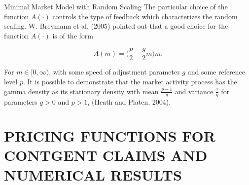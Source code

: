 \documentclass[unknownkeysallowed, compress]{beamer}
\theoremstyle{plain}
\begin{document}
\begin{frame}[allowframebreaks]{Minimal Market Model with Random Scaling}
The particular choice of the function $A(\cdot)$ controls the type of feedback which characterizes the random scaling. W. Breymann et al, (2005) pointed out that a good choice for the function $A(\cdot)$ is of the form

\begin{equation}\label{4.9}
A(m) = \bigg(\frac{p}{2}-\frac{g}{2}m\bigg)m.
\end{equation}

For $m\in[0,\infty)$, with some speed of adjustment parameter $g$ and some reference level $p$. It is possible to demonstrate that the market activity process has %
the gamma density as its stationary density with mean $\frac{p-1}{g}$ and variance $\frac{1}{g}$ for parameters  $g>0$ and $p>1$, (Heath and Platen, 2004).



\end{frame}
\section{PRICING FUNCTIONS FOR CONTGENT CLAIMS AND NUMERICAL RESULTS}

\end{document}

